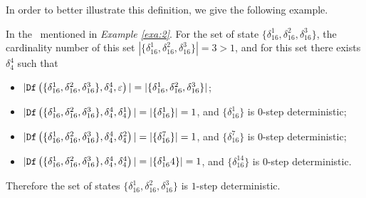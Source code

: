  In order to better illustrate this definition, we give the following example.
\begin{example}
In the \BCN\ mentioned in {\em Example \ref{exa:2}}. For the set of state $\{\delta_{16}^1,\delta_{16}^2,\delta_{16}^3\}$, the cardinality number of this set $|\{\delta_{16}^1,\delta_{16}^2,\delta_{16}^3\}|=3>1$, and for this set there exists $\delta_{4}^4$ such that 
 \begin{itemize}
 \item  $|{\tt Df}\left(\{\delta_{16}^1,\delta_{16}^2,\delta_{16}^3\},\delta_{4}^4,\varepsilon\right)|=|\{\delta_{16}^1,\delta_{16}^2,\delta_{16}^3\}|$;
 \item  $|{\tt Df}\left(\{\delta_{16}^1,\delta_{16}^2,\delta_{16}^3\},\delta_{4}^4,\delta_{4}^1\right)|=|\{\delta_{16}^1\}|=1$, and $\{\delta_{16}^1\}$ is $0$-step deterministic;
 \item  $|{\tt Df}\left(\{\delta_{16}^1,\delta_{16}^2,\delta_{16}^3\},\delta_{4}^4,\delta_{4}^2\right)|=|\{\delta_{16}^7\}|=1$, and $\{\delta_{16}^7\}$ is $0$-step deterministic;
  \item  $|{\tt Df}\left(\{\delta_{16}^1,\delta_{16}^2,\delta_{16}^3\},\delta_{4}^4,\delta_{4}^4\right)|=|\{\delta_{16}^14\}|=1$, and $\{\delta_{16}^14\}$ is $0$-step deterministic.
 \end{itemize}
 Therefore the set of states $\{\delta_{16}^1,\delta_{16}^2,\delta_{16}^3\}$ is $1$-step deterministic.
\end{example}  

